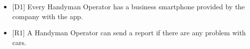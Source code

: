 \subsubsection{\gHandymanReportIssue}
\begin{itemize}
	\item {[}D1{]} Every Handyman Operator has a business smartphone provided by the company with the app.
	\item {[}R1{]} A Handyman Operator can send a report if there are any problem with cars.
\end{itemize}